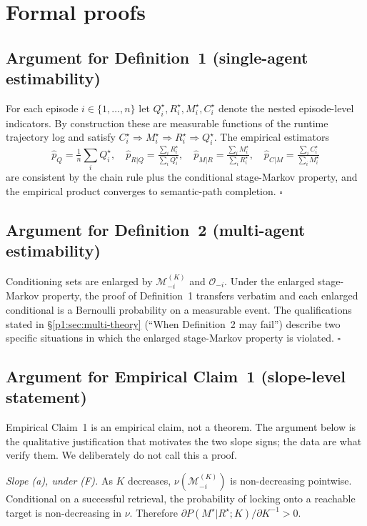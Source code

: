 \documentclass{article}
\begin{document}
\section{Formal proofs}
\label{p1:app:proofs}

\subsection{Argument for Definition~1 (single-agent estimability)}

For each episode $i \in \{1,\dots,n\}$ let $Q_i^\star, R_i^\star, M_i^\star, C_i^\star$ denote the nested episode-level indicators. By construction these are measurable functions of the runtime trajectory log and satisfy $C_i^\star \Rightarrow M_i^\star \Rightarrow R_i^\star \Rightarrow Q_i^\star$. The empirical estimators
\[
\hat p_Q = \tfrac{1}{n}\sum_i Q_i^\star,\quad
\hat p_{R|Q} = \tfrac{\sum_i R_i^\star}{\sum_i Q_i^\star},\quad
\hat p_{M|R} = \tfrac{\sum_i M_i^\star}{\sum_i R_i^\star},\quad
\hat p_{C|M} = \tfrac{\sum_i C_i^\star}{\sum_i M_i^\star}
\]
are consistent by the chain rule plus the conditional stage-Markov property, and the empirical product converges to semantic-path completion. \hfill$\square$

\subsection{Argument for Definition~2 (multi-agent estimability)}

Conditioning sets are enlarged by $\mathcal{M}_{-i}^{(K)}$ and $\mathcal{O}_{-i}$. Under the enlarged stage-Markov property, the proof of Definition~1 transfers verbatim and each enlarged conditional is a Bernoulli probability on a measurable event. The qualifications stated in \S\ref{p1:sec:multi-theory} (``When Definition~2 may fail'') describe two specific situations in which the enlarged stage-Markov property is violated. \hfill$\square$

\subsection{Argument for Empirical Claim~1 (slope-level statement)}

Empirical Claim~1 is an empirical claim, not a theorem. The argument below is the qualitative justification that motivates the two slope signs; the data are what verify them. We deliberately do not call this a proof.

\emph{Slope (a), under (F).} As $K$ decreases, $\nu(\mathcal{M}_{-i}^{(K)})$ is non-decreasing pointwise. Conditional on a successful retrieval, the probability of locking onto a reachable target is non-decreasing in $\nu$. Therefore $\partial P(M^\star|R^\star;K) / \partial K^{-1} > 0$.
\end{document}
